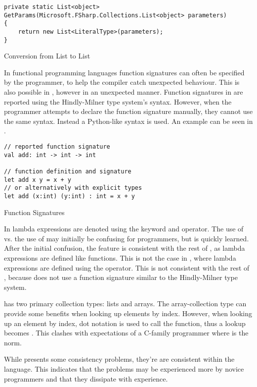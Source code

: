 \begin{listing}[H]
\begin{verbatim}
private static List<object> GetParams(Microsoft.FSharp.Collections.List<object> parameters)
{
    return new List<LiteralType>(parameters);
}
\end{verbatim}
\caption{Conversion from \fs List to \cs List}
\label{lst:list-conv}
\end{listing}

In functional programming languages function signatures can often be specified by the programmer, to help the compiler catch unexpected behaviour. This is also possible in \fs, however in an unexpected manner. Function signatures in \fs are reported using the Hindly-Milner type system's syntax\cite{fsharp:type:inference}. However, when the programmer attempts to declare the function signature manually, they cannot use the same syntax. Instead a Python-like syntax is used. An example can be seen in .

\begin{listing}[H]
\begin{verbatim}
// reported function signature
val add: int -> int -> int

// function definition and signature
let add x y = x + y
// or alternatively with explicit types
let add (x:int) (y:int) : int = x + y
\end{verbatim}
\caption{Function Signatures}
\label{lst:fun-sig}
\end{listing}

In \fs lambda expressions are denoted using the  keyword and \ttt{-\textgreater} operator. The use of  vs. the use of  may initially be confusing for programmers, but is quickly learned. After the initial confusion, the feature is consistent with the rest of \fs, as lambda expressions are defined like functions. This is not the case in \cs, where lambda expressions are defined using the \ttt{=\textgreater} operator. This is not consistent with the rest of \cs, because \cs does not use a function signature similar to the Hindly-Milner type system.

\fs has two primary collection types: lists and arrays. The array-collection type can provide some benefits when looking up elements by index.  However, when looking up an element by index, dot notation is used to call the \ttt{[]} function, thus a lookup becomes . This clashes with expectations of a C-family programmer where  is the norm.

While \fs presents some consistency problems, they're are consistent within the language. This indicates that the problems may be experienced more by novice programmers and that they dissipate with experience.
